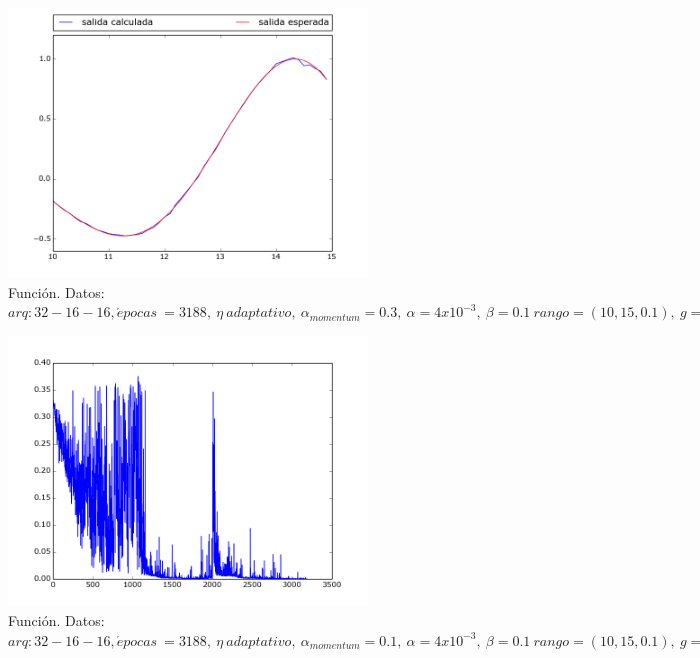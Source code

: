 \documentclass[12pt,a4paper]{article}
\begin{document}
\begin{figure}[H]
\centering
\includegraphics[width=0.85\textwidth]{img/_32__16__16_-momentumadaptative-1430834275_8048704-FUNCTION.png}
\caption{\label{fig:test10-15-tanh-fn-32-adaptative-momentum} Función. Datos:  $arq: 32-16-16, \acute{e} pocas \ = 3188, \ \eta \ adaptativo, \ \alpha_{momentum} = 0.3, \ \alpha = 4x10^{-3},\ \beta =0.1  \ rango=(10, 15, 0.1),\ g=tanh, \ E =8,64 \times 10^{-5}$}
\end{figure}

\begin{figure}[H]
\centering
\includegraphics[width=0.85\textwidth]{img/_32__16__16_-momentumadaptative-1430834275_8048704-ERROR.png}
\caption{\label{fig:test10-15-tanh-error-32-adaptative-momentum} Función. Datos:  $arq: 32-16-16, \acute{e} pocas \ = 3188, \ \eta \ adaptativo, \ \alpha_{momentum} = 0.1, \ \alpha = 4x10^{-3},\ \beta =0.1  \ rango=(10, 15, 0.1),\ g=tanh, \ E =8,64 \times 10^{-5}$}
\end{figure}
\end{document}
